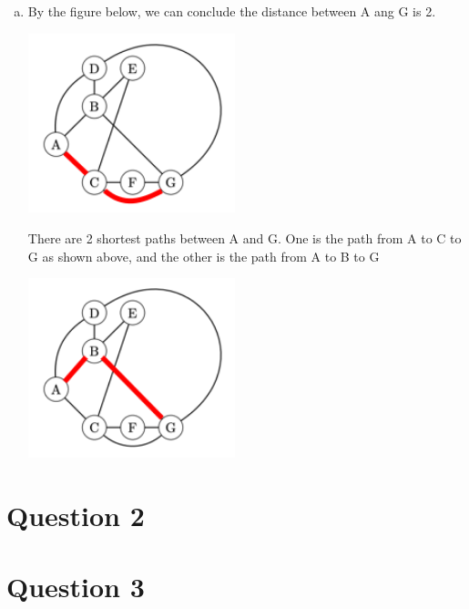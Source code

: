 \documentclass[12pt]{article}
\begin{document}
\begin{enumerate}[a.]
    \item
    By the figure below, we can conclude the distance between A ang G is 2.

    \begin{center}
    \includegraphics[width=6cm]{images/worksheet_19_q1d_solution.png}
    \end{center}

    \bigskip

    There are 2 shortest paths between A and G. One is the path from A to C to G as
    shown above, and the other is the path from A to B to G

    \begin{center}
    \includegraphics[width=6cm]{images/worksheet_19_q1d2_solution.png}
    \end{center}

\end{enumerate}

\section*{Question 2}

\section*{Question 3}
\end{document}
